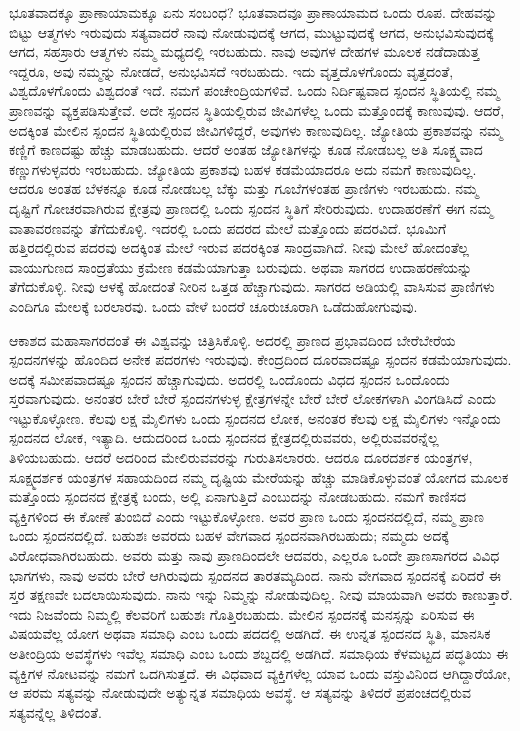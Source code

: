 ಭೂತವಾದಕ್ಕೂ ಪ್ರಾಣಾಯಾಮಕ್ಕೂ ಏನು ಸಂಬಂಧ? ಭೂತವಾದವೂ ಪ್ರಾಣಾಯಾಮದ ಒಂದು ರೂಪ. ದೇಹವನ್ನು ಬಿಟ್ಟು ಆತ್ಮಗಳು ಇರುವುದು ಸತ್ಯವಾದರೆ ನಾವು ನೋಡುವುದಕ್ಕೆ ಆಗದ, ಮುಟ್ಟುವುದಕ್ಕೆ ಆಗದ, ಅನುಭವಿಸುವುದಕ್ಕೆ ಆಗದ, ಸಹಸ್ರಾರು ಆತ್ಮಗಳು ನಮ್ಮ ಮಧ್ಯದಲ್ಲಿ ಇರಬಹುದು. ನಾವು ಅವುಗಳ ದೇಹಗಳ ಮೂಲಕ ನಡೆದಾಡುತ್ತ ಇದ್ದರೂ, ಅವು ನಮ್ಮನ್ನು ನೋಡದೆ, ಅನುಭವಿಸದೆ ಇರಬಹುದು. ಇದು ವೃತ್ತದೊಳಗೊಂದು ವೃತ್ತದಂತೆ, ವಿಶ್ವದೊಳಗೊಂದು ವಿಶ್ವದಂತೆ ಇದೆ. ನಮಗೆ ಪಂಚೇಂದ್ರಿಯಗಳಿವೆ. ಒಂದು ನಿರ್ದಿಷ್ಟವಾದ ಸ್ಪಂದನ ಸ್ಥಿತಿಯಲ್ಲಿ ನಮ್ಮ ಪ್ರಾಣವನ್ನು ವ್ಯಕ್ತಪಡಿಸುತ್ತೇವೆ. ಅದೇ ಸ್ಪಂದನ ಸ್ಥಿತಿಯಲ್ಲಿರುವ ಜೀವಿಗಳೆಲ್ಲ ಒಂದು ಮತ್ತೊಂದಕ್ಕೆ ಕಾಣುವುವು. ಆದರೆ, ಅದಕ್ಕಿಂತ ಮೇಲಿನ ಸ್ಪಂದನ ಸ್ಥಿತಿಯಲ್ಲಿರುವ ಜೀವಿಗಳಿದ್ದರೆ, ಅವುಗಳು ಕಾಣುವುದಿಲ್ಲ. ಜ್ಯೋತಿಯ ಪ್ರಕಾಶವನ್ನು ನಮ್ಮ ಕಣ್ಣಿಗೆ ಕಾಣದಷ್ಟು ಹೆಚ್ಚು ಮಾಡಬಹುದು. ಆದರೆ ಅಂತಹ ಜ್ಯೋತಿಗಳನ್ನು ಕೂಡ ನೋಡಬಲ್ಲ ಅತಿ ಸೂಕ್ಷ್ಮವಾದ ಕಣ್ಣುಗಳುಳ್ಳವರು ಇರಬಹುದು. ಜ್ಯೋತಿಯ ಪ್ರಕಾಶವು ಬಹಳ ಕಡಮೆಯಾದರೂ ಅದು ನಮಗೆ ಕಾಣುವುದಿಲ್ಲ. ಆದರೂ ಅಂತಹ ಬೆಳಕನ್ನೂ ಕೂಡ ನೋಡಬಲ್ಲ ಬೆಕ್ಕು ಮತ್ತು ಗೂಬೆಗಳಂತಹ ಪ್ರಾಣಿಗಳು ಇರಬಹುದು. ನಮ್ಮ ದೃಷ್ಟಿಗೆ ಗೋಚರವಾಗಿರುವ ಕ್ಷೇತ್ರವು ಪ್ರಾಣದಲ್ಲಿ ಒಂದು ಸ್ಪಂದನ ಸ್ಥಿತಿಗೆ ಸೇರಿರುವುದು. ಉದಾಹರಣೆಗೆ ಈಗ ನಮ್ಮ ವಾತಾವರಣವನ್ನು ತೆಗೆದುಕೊಳ್ಳಿ. ಇದರಲ್ಲಿ ಒಂದು ಪದರದ ಮೇಲೆ ಮತ್ತೊಂದು ಪದರವಿದೆ. ಭೂಮಿಗೆ ಹತ್ತಿರದಲ್ಲಿರುವ ಪದರವು ಅದಕ್ಕಿಂತ ಮೇಲೆ ಇರುವ ಪದರಕ್ಕಿಂತ ಸಾಂದ್ರವಾಗಿದೆ. ನೀವು ಮೇಲೆ ಹೋದಂತೆಲ್ಲ ವಾಯುಗುಣದ ಸಾಂದ್ರತೆಯು ಕ್ರಮೇಣ ಕಡಮೆಯಾಗುತ್ತಾ ಬರುವುದು. ಅಥವಾ ಸಾಗರದ ಉದಾಹರಣೆಯನ್ನು ತೆಗೆದುಕೊಳ್ಳಿ. ನೀವು ಆಳಕ್ಕೆ ಹೋದಂತೆ ನೀರಿನ ಒತ್ತಡ ಹೆಚ್ಚಾಗುವುದು. ಸಾಗರದ ಅಡಿಯಲ್ಲಿ ವಾಸಿಸುವ ಪ್ರಾಣಿಗಳು ಎಂದಿಗೂ ಮೇಲಕ್ಕೆ ಬರಲಾರವು. ಒಂದು ವೇಳೆ ಬಂದರೆ ಚೂರುಚೂರಾಗಿ ಒಡೆದುಹೋಗುವುವು. 

ಆಕಾಶದ ಮಹಾಸಾಗರದಂತೆ ಈ ವಿಶ್ವವನ್ನು ಚಿತ್ರಿಸಿಕೊಳ್ಳಿ. ಅದರಲ್ಲಿ ಪ್ರಾಣದ ಪ್ರಭಾವದಿಂದ ಬೇರೆಬೇರೆಯ ಸ್ಪಂದನಗಳನ್ನು ಹೊಂದಿದ ಅನೇಕ ಪದರಗಳು ಇರುವುವು. ಕೇಂದ್ರದಿಂದ ದೂರವಾದಷ್ಟೂ ಸ್ಪಂದನ ಕಡಮೆಯಾಗುವುದು. ಅದಕ್ಕೆ ಸಮೀಪವಾದಷ್ಟೂ ಸ್ಪಂದನ ಹೆಚ್ಚಾಗುವುದು. ಅದರಲ್ಲಿ ಒಂದೊಂದು ವಿಧದ ಸ್ಪಂದನ ಒಂದೊಂದು ಸ್ತರವಾಗುವುದು. ಅನಂತರ ಬೇರೆ ಬೇರೆ ಸ್ಪಂದನಗಳುಳ್ಳ ಕ್ಷೇತ್ರಗಳನ್ನೇ ಬೇರೆ ಬೇರೆ ಲೋಕಗಳಾಗಿ ವಿಂಗಡಿಸಿದೆ ಎಂದು ಇಟ್ಟುಕೊಳ್ಳೋಣ. ಕೆಲವು ಲಕ್ಷ ಮೈಲಿಗಳು ಒಂದು ಸ್ಪಂದನದ ಲೋಕ, ಅನಂತರ ಕೆಲವು ಲಕ್ಷ ಮೈಲಿಗಳು ಇನ್ನೊಂದು ಸ್ಪಂದನದ ಲೋಕ, ಇತ್ಯಾದಿ. ಆದುದರಿಂದ ಒಂದು ಸ್ಪಂದನದ ಕ್ಷೇತ್ರದಲ್ಲಿರುವವರು, ಅಲ್ಲಿರುವವರನ್ನೆಲ್ಲ ತಿಳಿಯಬಹುದು. ಆದರೆ ಅದರಿಂದ ಮೇಲಿರುವವರನ್ನು ಗುರುತಿಸಲಾರರು. ಆದರೂ ದೂರದರ್ಶಕ ಯಂತ್ರಗಳ, ಸೂಕ್ಷ್ಮದರ್ಶಕ ಯಂತ್ರಗಳ ಸಹಾಯದಿಂದ ನಮ್ಮ ದೃಷ್ಟಿಯ ಮೇರೆಯನ್ನು ಹೆಚ್ಚು ಮಾಡಿಕೊಳ್ಳುವಂತೆ ಯೋಗದ ಮೂಲಕ ಮತ್ತೊಂದು ಸ್ಪಂದನದ ಕ್ಷೇತ್ರಕ್ಕೆ ಬಂದು, ಅಲ್ಲಿ ಏನಾಗುತ್ತಿದೆ ಎಂಬುದನ್ನು ನೋಡಬಹುದು. ನಮಗೆ ಕಾಣಿಸದ ವ್ಯಕ್ತಿಗಳಿಂದ ಈ ಕೋಣೆ ತುಂಬಿದೆ ಎಂದು ಇಟ್ಟುಕೊಳ್ಳೋಣ. ಅವರ ಪ್ರಾಣ ಒಂದು ಸ್ಪಂದನದಲ್ಲಿದೆ, ನಮ್ಮ ಪ್ರಾಣ ಒಂದು ಸ್ಪಂದನದಲ್ಲಿದೆ. ಬಹುಶಃ ಅವರದು ಬಹಳ ವೇಗವಾದ ಸ್ಪಂದನವಾಗಿರಬಹುದು; ನಮ್ಮದು ಅದಕ್ಕೆ ವಿರೋಧವಾಗಿರಬಹುದು. ಅವರು ಮತ್ತು ನಾವು ಪ್ರಾಣದಿಂದಲೇ ಆದವರು, ಎಲ್ಲರೂ ಒಂದೇ ಪ್ರಾಣಸಾಗರದ ವಿವಿಧ ಭಾಗಗಳು, ನಾವು ಅವರು ಬೇರೆ ಆಗಿರುವುದು ಸ್ಪಂದನದ ತಾರತಮ್ಯದಿಂದ. ನಾನು ವೇಗವಾದ ಸ್ಪಂದನಕ್ಕೆ ಏರಿದರೆ ಈ ಸ್ತರ ತಕ್ಷಣವೇ ಬದಲಾಯಿಸುವುದು. ನಾನು ಇನ್ನು ನಿಮ್ಮನ್ನು ನೋಡುವುದಿಲ್ಲ. ನೀವು ಮಾಯವಾಗಿ ಅವರು ಕಾಣುತ್ತಾರೆ. ಇದು ನಿಜವೆಂದು ನಿಮ್ಮಲ್ಲಿ ಕೆಲವರಿಗೆ ಬಹುಶಃ ಗೊತ್ತಿರಬಹುದು. ಮೇಲಿನ ಸ್ಪಂದನಕ್ಕೆ ಮನಸ್ಸನ್ನು ಏರಿಸುವ ಈ ವಿಷಯವೆಲ್ಲ ಯೋಗ ಅಥವಾ ಸಮಾಧಿ ಎಂಬ ಒಂದು ಪದದಲ್ಲಿ ಅಡಗಿದೆ. ಈ ಉನ್ನತ ಸ್ಪಂದನದ ಸ್ಥಿತಿ, ಮಾನಸಿಕ ಅತೀಂದ್ರಿಯ ಅವಸ್ಥೆಗಳು ಇವೆಲ್ಲ ಸಮಾಧಿ ಎಂಬ ಒಂದು ಶಬ್ದದಲ್ಲಿ ಅಡಗಿದೆ. ಸಮಾಧಿಯ ಕೆಳಮಟ್ಟದ ಪದ್ಧತಿಯು ಈ ವ್ಯಕ್ತಿಗಳ ನೋಟವನ್ನು ನಮಗೆ ಒದಗಿಸುತ್ತದೆ. ಈ ವಿಧವಾದ ವ್ಯಕ್ತಿಗಳೆಲ್ಲ ಯಾವ ಒಂದು ವಸ್ತುವಿನಿಂದ ಆಗಿದ್ದಾರೆಯೋ, ಆ ಪರಮ ಸತ್ಯವನ್ನು ನೋಡುವುದೇ ಅತ್ಯುನ್ನತ ಸಮಾಧಿಯ ಅವಸ್ಥೆ. ಆ ಸತ್ಯವನ್ನು ತಿಳಿದರೆ ಪ್ರಪಂಚದಲ್ಲಿರುವ ಸತ್ಯವನ್ನೆಲ್ಲ ತಿಳಿದಂತೆ. 

